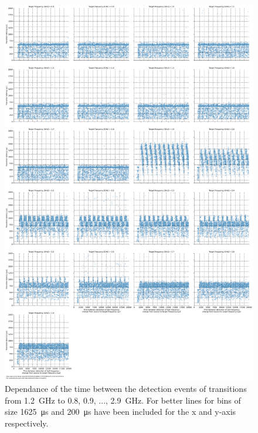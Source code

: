 \begin{figure}[]
    \centering
    \includegraphics[width=\columnwidth]{fig/ftalat/ftalat_scatter_wait_transition_latency_hati_source_1.2.pdf}
    \caption{Dependance of the time between the detection events of transitions from \SI{1.2}{\GHz} to \SI{0.8}{}, \SI{0.9}{}, ..., \SI{2.9}{\GHz}. For better lines for bins of size \SI{1625}{\us} and \SI{200}{\us} have been included for the x and y-axis respectively.}
\end{figure}
